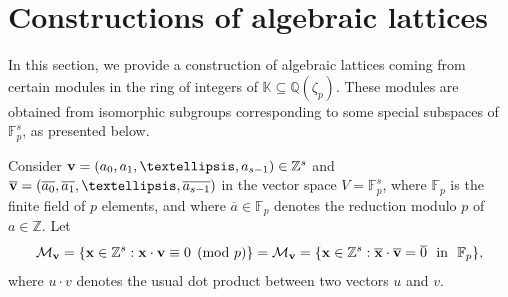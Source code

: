 \documentclass[10pt,a4paper]{amsart}
\begin{document}

\section{Constructions of algebraic lattices} \label{sec-5}

In this section, we provide a construction of algebraic lattices coming from certain modules in the ring of integers of $\mathbb{K}\subseteq\mathbb{Q}(\zeta_p)$. These modules are obtained from isomorphic subgroups corresponding to some special subspaces of $\mathbb{F}_p^s$, as presented below.

Consider ${\bf v}=(a_0,a_1,\ldots,a_{s-1})\in \mathbb{Z}^s$
and $\overline{\bf v}=(\overline{a_0},\overline{a_1},\ldots,\overline{a_{s-1}})$ in the vector space $V=\mathbb{F}_{p}^s$, where $\mathbb{F}_p$ is the finite field of $p$ elements, and where $\overline{a}\in\mathbb{F}_p$ denotes the reduction modulo $p$ of $a\in\mathbb{Z}$. Let \[ \mathcal{M}_{\bf v} = \{{\bf x}\in\mathbb{Z}^s:{\bf x}\cdot{\bf v}\equiv 0\pmod p\} = \mathcal{M}_{\bf v} = \{{\bf x}\in\mathbb{Z}^s:\overline{\bf x}\cdot\overline{\bf v}=\overline{0} \ \ \mbox{in} \ \ \mathbb{F}_p\}, \] where  $u\cdot v$ denotes the usual dot product between two vectors $u$ and $v$.
\end{document}
